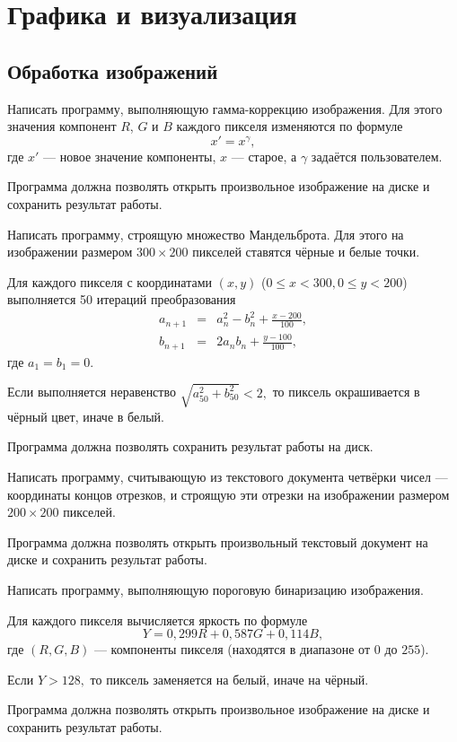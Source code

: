 \section{Графика и визуализация}

\subsection{Обработка изображений}

\task Написать программу, выполняющую гамма-коррекцию изображения. Для
этого значения компонент $R$, $G$ и $B$ каждого пикселя изменяются по
формуле
\[
x'=x^{\gamma},
\]
где $x'$ — новое значение компоненты, $x$ — старое, а $\gamma$
задаётся пользователем.

Программа должна позволять открыть произвольное изображение на диске и
сохранить результат работы.

\task Написать программу, строящую множество Мандельброта. Для этого
на изображении размером $300 \times 200$ пикселей ставятся чёрные и
белые точки.

Для каждого пикселя с координатами $(x, y)$
($0\leqslant x < 300, 0\leqslant y < 200$) выполняется 50 итераций
преобразования
\begin{eqnarray*}
a_{n+1} &=& a_n^2 - b_n^2 + \frac{x - 200}{100},\\
b_{n+1} &=& 2 a_n b_n + \frac{y-100}{100},
\end{eqnarray*}
где $a_1=b_1=0.$

Если выполняется неравенство $\sqrt{a_{50}^2 + b_{50}^2} < 2,$ то
пиксель окрашивается в чёрный цвет, иначе в белый.

Программа должна позволять сохранить результат работы на диск.

\task Написать программу, считывающую из текстового документа четвёрки
чисел — координаты концов отрезков, и строящую эти отрезки на изображении
размером $200\times 200$ пикселей.

Программа должна позволять открыть произвольный текстовый документ на
диске и сохранить результат работы.

\task Написать программу, выполняющую пороговую бинаризацию
изображения.

Для каждого пикселя вычисляется яркость по формуле
\[
Y = 0{,}299 R + 0{,}587 G + 0{,}114 B,
\]
где $(R, G, B)$ — компоненты пикселя (находятся в диапазоне от $0$ до
$255$).

Если $Y > 128,$ то пиксель заменяется на белый, иначе на чёрный.

Программа должна позволять открыть произвольное изображение на диске и
сохранить результат работы.

